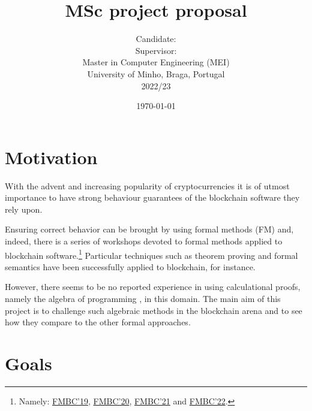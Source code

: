 \documentclass[a4paper, 11pt]{article} %
\title{\textbf{MSc project proposal}\\ \vspace{0.5cm}\msctitle}
\author{
	  Candidate:  \textsc{\msccandidate}
	\\Supervisor: \textsc{\mscsupervisor}
	\\
	\vspace{0.5cm}
    \normalsize{Master in Computer Engineering (MEI)\\ University of Minho, Braga, Portugal}
    \\ 2022/23
    } %
\date{\today}
\makeatletter
\renewcommand{\maketitle}{ %
\begin{center} %
{\LARGE\@title} %

\vspace{50pt} %

{\large\@author} %

\vspace{40pt} %
\end{center}
}
\makeatother
\begin{document}
\maketitle %






\section*{Motivation}

With the advent and increasing popularity of cryptocurrencies %
it is of utmost importance to have strong behaviour guarantees of the blockchain
software they rely upon.

Ensuring correct behavior can be brought by using formal methods (FM) and,
indeed, there is a series of workshops devoted to formal methods applied
to blockchain software.\footnote{\label{fn:221012a} Namely: \href{https://sites.google.com/view/fmbc}{FMBC'19},
\href{https://fmbc.gitlab.io/2020}{FMBC'20}, \href{https://fmbc.gitlab.io/2021}{FMBC'21}
and \href{https://fmbc.gitlab.io/2022}{FMBC'22}.} Particular techniques such
as theorem proving and formal semantics have been successfully applied to
blockchain, for instance.

However, there seems to be no reported experience in using calculational
proofs, namely the algebra of programming \cite{BM97,Ol05}, in this domain.
The main aim of this project is to challenge such algebraic methods in the
blockchain arena and to see how they compare to the other formal approaches.

\section*{Goals}
\end{document}
